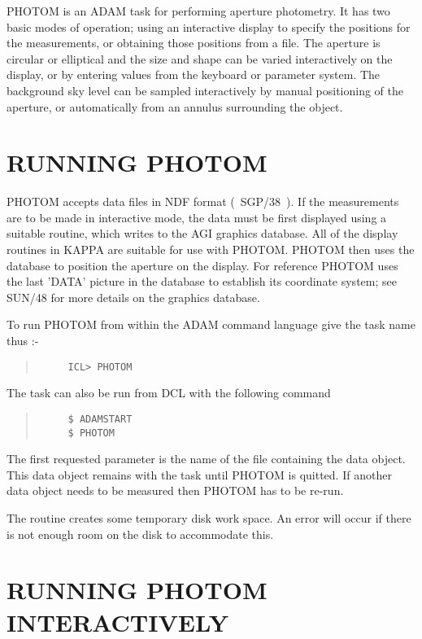 PHOTOM is an ADAM task for performing aperture photometry. It has two
basic modes of operation; using an interactive display to specify the
positions for the measurements, or obtaining those positions from a file.
The aperture is circular or elliptical and the size and shape can be
varied interactively on the display, or by entering values from the
keyboard or parameter system. The background sky level can be sampled
interactively by manual positioning of the aperture, or automatically
from an annulus surrounding the object.


\section{RUNNING PHOTOM}

PHOTOM accepts data files in NDF format (~SGP/38~).
If the measurements are to be made in interactive mode, the data must
be first displayed using a suitable routine, which writes to the AGI
graphics database. All of the display routines in KAPPA are suitable
for use with PHOTOM. PHOTOM then uses the database to position the
aperture on the display. For reference PHOTOM uses the last 'DATA'
picture in the database to establish its coordinate system; see SUN/48
for more details on the graphics database.

To run PHOTOM from within the ADAM command language give the task name
thus :-
\begin{quote}
\begin{verbatim}
     ICL> PHOTOM
\end{verbatim}
\end{quote}

The task can also be run from DCL with the following command
\begin{quote}
\begin{verbatim}
     $ ADAMSTART
     $ PHOTOM
\end{verbatim}
\end{quote}

The first requested parameter is the name of the file containing the
data object. This data object remains with the task until PHOTOM is
quitted. If another data object needs to be measured then PHOTOM has
to be re-run.

The routine creates some temporary disk work space. An error will occur
if there is not enough room on the disk to accommodate this.


\section{RUNNING PHOTOM INTERACTIVELY}

